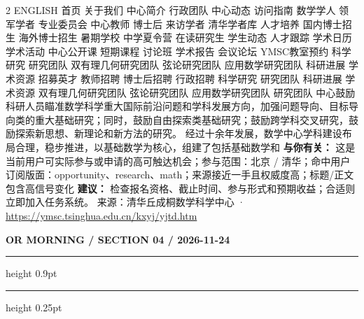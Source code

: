 \documentclass[10.5pt]{ctexart}
\begin{document}
\begin{multicols}{2}
ENGLISH 首页 关于我们 中心简介 行政团队 中心动态 访问指南 数学学人 领军学者 专业委员会 中心教师 博士后 来访学者 清华学者库 人才培养 国内博士招生 海外博士招生 暑期学校 中学夏令营 在读研究生 学生动态 人才跟踪 学术日历 学术活动 中心公开课 短期课程 讨论班 学术报告 会议论坛 YMSC教室预约 科学研究 研究团队 双有理几何研究团队 弦论研究团队 应用数学研究团队 科研进展 学术资源 招募英才 教师招聘 博士后招聘 行政招聘 科学研究 研究团队 科研进展 学术资源 双有理几何研究团队 弦论研究团队 应用数学研究团队 研究团队 中心鼓励科研人员瞄准数学科学重大国际前沿问题和学科发展方向，加强问题导向、目标导向类的重大基础研究；同时，鼓励自由探索类基础研究；鼓励跨学科交叉研究，鼓励探索新思想、新理论和新方法的研究。 经过十余年发展，数学中心学科建设布局合理，稳步推进，以基础数学为核心，组建了包括基础数学和
\textbf{与你有关：} 这是当前用户可实际参与或申请的高可触达机会；参与范围：北京 / 清华；命中用户订阅版面：opportunity、research、math；来源接近一手且权威度高；标题/正文包含高信号变化
\textbf{建议：} 检查报名资格、截止时间、参与形式和预期收益；合适则立即加入任务系统。
{\footnotesize\color{ormuted} 来源：清华丘成桐数学科学中心 · \url{https://ymsc.tsinghua.edu.cn/kxyj/yjtd.htm}}
\end{multicols}
\newpage
{\small\bfseries OR MORNING / SECTION 04 / 2026-11-24}
\vspace{2mm}
\hrule height 0.9pt
\vspace{1.5mm}
\hrule height 0.25pt
\vspace{4mm}
\end{document}
